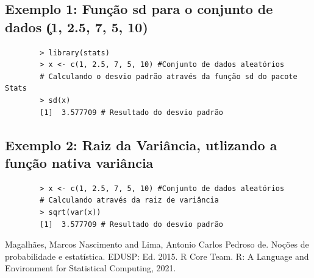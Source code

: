 \documentclass[12pt,a4paper]{article}
\begin{document}
	\subsection*{Exemplo 1: Função sd para o conjunto de dados \c(1, 2.5, 7, 5, 10)}

	\begin{verbatim}
		> library(stats)
		> x <- c(1, 2.5, 7, 5, 10) #Conjunto de dados aleatórios
		# Calculando o desvio padrão através da função sd do pacote Stats
		> sd(x)
		[1]  3.577709 # Resultado do desvio padrão
	\end{verbatim}
	
	\subsection*{Exemplo 2: Raiz da Variância, utlizando a função nativa variância}
	
	\begin{verbatim}
		> x <- c(1, 2.5, 7, 5, 10) #Conjunto de dados aleatórios
		# Calculando através da raiz de variância
		> sqrt(var(x))
		[1]  3.577709 # Resultado do desvio padrão
		\end{verbatim}

	
	
	\begin{thebibliography}{100}
		
		 Magalhães, Marcos Nascimento and Lima, Antonio Carlos Pedroso de. Noções de probabilidade e estatística. EDUSP: Ed. 2015.
		 R Core Team. R: A Language and Environment for Statistical Computing, 2021.
	\end{thebibliography}
	
\end{document}
